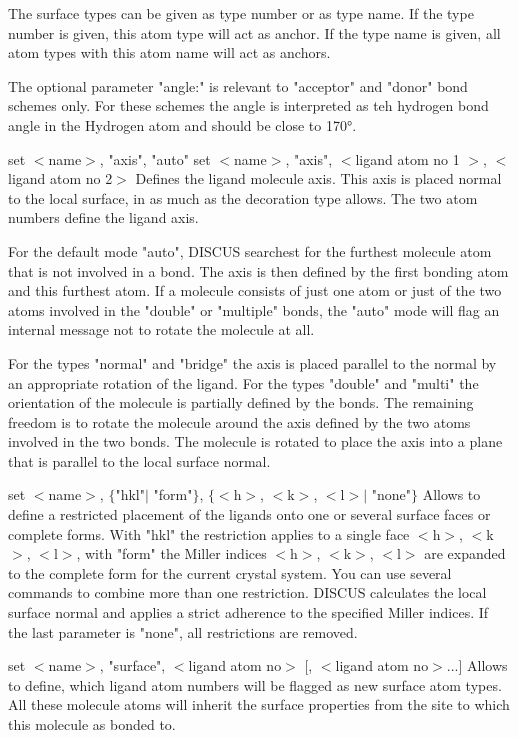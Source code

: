     The surface types can be given as type number or as type name. 
    If the type number is given, this atom type will act as anchor. 
    If the type name is given, all atom types with this atom name will act 
    as anchors. 
\par
    The optional parameter "angle:" is relevant to "acceptor" and 
    "donor" bond schemes only. For these schemes the angle is 
    interpreted as teh hydrogen bond angle in the Hydrogen atom and 
    should be close to 170°. 
\par
set $ <$name$> $, "axis", "auto" 
set $ <$name$> $, "axis", $ <$ligand atom no 1 $> $, $ <$ligand atom no 2$> $ 
    Defines the ligand molecule axis. This axis is placed normal to the local 
    surface, in as much as the decoration type allows. 
    The two atom numbers define the ligand axis. 
\par
    For the default mode "auto", DISCUS searchest for the furthest molecule 
    atom that is not involved in a bond. The axis is then defined by 
    the first bonding atom and this furthest atom. 
    If a molecule consists of just one atom or just of the two atoms 
    involved in the "double" or "multiple" bonds, the "auto" mode will 
    flag an internal message not to rotate the molecule at all. 
\par
    For the types "normal" and "bridge" the axis is placed parallel to the 
    normal by an appropriate rotation of the ligand. 
    For the types "double" and "multi" the orientation of the molecule is 
    partially defined by the bonds. The remaining freedom is to rotate 
    the molecule around the axis defined by the two atoms involved in the 
    two bonds. The molecule is rotated to place the axis into a 
    plane that is parallel to the local surface normal. 
\par
set $ <$name$> $, $ \{$"hkl"$| $ "form"$\} $, $ \{$$ <$h$> $, $ <$k$> $, $ <$l$> $$| $ "none"$\} $ 
    Allows to define a restricted placement of the ligands onto one or 
    several surface faces or complete forms. 
    With "hkl" the restriction applies to a single face $ <$h$> $, $ <$k$> $, $ <$l$> $, 
    with "form" the Miller indices $ <$h$> $, $ <$k$> $, $ <$l$> $ are expanded to the 
    complete form for the current crystal system. 
    You can use several commands to combine more than one restriction. 
    DISCUS calculates the local surface normal and applies a strict 
    adherence to the specified Miller indices. 
    If the last parameter is "none", all restrictions are removed. 
\par
set $ <$name$> $, "surface", $ <$ligand atom no$> $ [, $ <$ligand atom no$> $...] 
    Allows to define, which ligand atom numbers will be flagged as 
    new surface atom types. All these molecule atoms will inherit the 
    surface properties from the site to which this molecule as bonded 
    to. 
